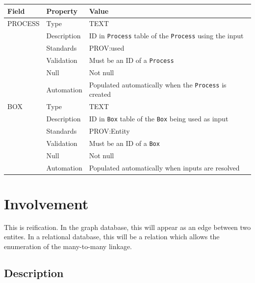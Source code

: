 \documentclass[
]{article}
\newcounter{none}
\begin{document}
{\def\LTcaptype{none} 
\begin{longtable}[]{@{}
  >{\raggedright\arraybackslash}p{}
  >{\raggedright\arraybackslash}p{}
  >{\raggedright\arraybackslash}p{}@{}}
\toprule\noalign{}
\begin{minipage}[b]{\linewidth}\raggedright
Field
\end{minipage} & \begin{minipage}[b]{\linewidth}\raggedright
Property
\end{minipage} & \begin{minipage}[b]{\linewidth}\raggedright
Value
\end{minipage} \\
\midrule\noalign{}
\endhead
\bottomrule\noalign{}
\endlastfoot
PROCESS & Type & TEXT \\
& Description & ID in \texttt{Process} table of the \texttt{Process}
using the input \\
& Standards & PROV:used \\
& Validation & Must be an ID of a \texttt{Process} \\
& Null & Not null \\
& Automation & Populated automatically when the \texttt{Process} is
created \\
BOX & Type & TEXT \\
& Description & ID in \texttt{Box} table of the \texttt{Box} being used
as input \\
& Standards & PROV:Entity \\
& Validation & Must be an ID of a \texttt{Box} \\
& Null & Not null \\
& Automation & Populated automatically when inputs are resolved \\
\end{longtable}
}

\section{Involvement}\label{involvement}

This is reification. In the graph database, this will appear as an edge
between two entites. In a relational database, this will be a relation
which allows the enumeration of the many-to-many linkage.

\subsection{Description}\label{description-16}
\end{document}
